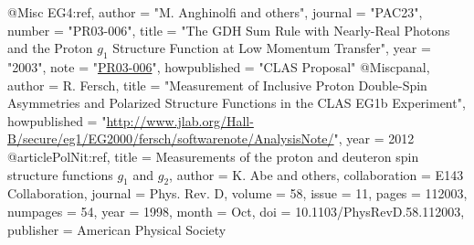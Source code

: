 @Misc{ EG4:ref,
	author = "{M. Anghinolfi and others}",
	journal = "PAC23",
	number = "PR03-006",
	title = "{The GDH Sum Rule with Nearly-Real Photons and the Proton $g_1$ Structure Function at Low Momentum Transfer}",
	year = "2003",
	note = "\href{http://www.jlab.org/exp_prog/proposals/03/PR03-006.pdf}{PR03-006}",
	howpublished = "CLAS Proposal"
}
@Misc{panal,
  author = {R. Fersch},
  title  = "Measurement of Inclusive Proton Double-Spin Asymmetries and Polarized Structure Functions in the CLAS EG1b Experiment",
  howpublished = "\url{http://www.jlab.org/Hall-B/secure/eg1/EG2000/fersch/softwarenote/AnalysisNote/}", 
  year = 2012
}
@article{PolNit:ref,
  title = {Measurements of the proton and deuteron spin structure functions ${g}_{1}$ and ${g}_{2}$},
  author = {K. Abe and others},
  collaboration = {E143 Collaboration},
  journal = {Phys. Rev. D},
  volume = {58},
  issue = {11},
  pages = {112003},
  numpages = {54},
  year = {1998},
  month = {Oct},
  doi = {10.1103/PhysRevD.58.112003},
  publisher = {American Physical Society}
}

